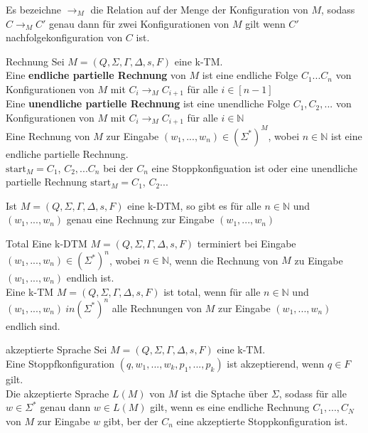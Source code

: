 
Es bezeichne $\rightarrow_M$ die Relation auf der Menge der Konfiguration von $M$, 
sodass $C \rightarrow_M C'$ genau dann für zwei Konfigurationen von $M$ gilt wenn $C'$ nachfolgekonfiguration von $C$ ist. 

\begin{defn}{Rechnung}
    Sei $M = (Q, \Sigma, \Gamma, \Delta, s, F)$ eine k-TM. \\
    
    Eine \textbf{endliche partielle Rechnung} von $M$ ist eine endliche Folge
    $C_1...C_n$ von Konfigurationen von $M$ mit $C_i \rightarrow_M C_{i+1}$ für alle $i \in [n-1]$ \\

    Eine \textbf{unendliche partielle Rechnung} ist eine unendliche Folge $C_1,C_2,...$ von Konfigurationen von $M$
    mit $C_i \rightarrow_M C_{i+1}$ für alle $i \in \mathbb{N}$ \\

    Eine Rechnung von $M$ zur Eingabe $(w_1,...,w_n) \in (\Sigma^*)^M$, wobei $n \in \mathbb{N}$ ist eine endliche partielle Rechnung. \\
    $\text{start}_M = C_1$, $C_2,...C_n$ bei der $C_n$ eine Stoppkonfiguation ist oder eine unendliche partielle Rechnung $\text{start}_M = C_1$, $C_2...$ 
\end{defn}

\begin{bem}
    Ist $M = (Q, \Sigma, \Gamma, \Delta, s, F)$ eine k-DTM, so gibt es für alle $n \in \mathbb{N}$ und $(w_1,...,w_n)$
    genau eine Rechnung zur Eingabe $(w_1,...,w_n)$
\end{bem}

\begin{defn}{Total}
    Eine k-DTM $M = (Q, \Sigma, \Gamma, \Delta, s, F)$ terminiert bei Eingabe $(w_1,...,w_n) \in (\Sigma^*)^n$,
    wobei $n \in \mathbb{N}$, wenn die Rechnung von $M$ zu Eingabe $(w_1,...,w_n)$ endlich ist. \\

    Eine k-TM $M = (Q, \Sigma, \Gamma, \Delta, s, F)$ ist total,  wenn für alle $n \in \mathbb{N}$ und 
    $(w_1,...,w_n) \ in (\Sigma^*)^n$ alle Rechnungen von $M$ zur Eingabe $(w_1,...,w_n)$ endlich sind.
\end{defn}

\begin{defn}{akzeptierte Sprache}
    Sei $M = (Q, \Sigma, \Gamma, \Delta, s, F)$ eine k-TM. \\
    Eine Stoppfkonfiguration $(q,w_1,...,w_k,p_1,...,p_k)$ ist akzeptierend, wenn $q \in F$ gilt. \\

    Die akzeptierte Sprache $L(M)$ von $M$ ist die Sptache über $\Sigma$, sodass für alle $w \in \Sigma^*$ genau dann $w \in L(M)$ gilt,
    wenn es eine endliche Rechnung $C_1,...,C_N$ von $M$ zur Eingabe $w$ gibt, ber der $C_n$ eine akzeptierte Stoppkonfiguration ist.
\end{defn}

